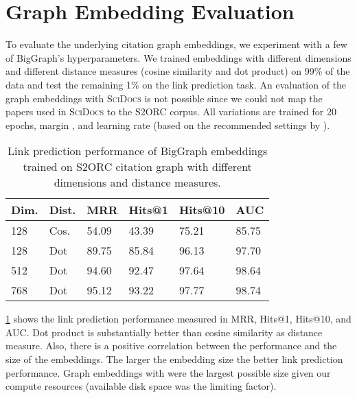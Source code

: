 \documentclass[11pt]{article}
\newcommand{\dataset}{\textsc{SciDocs}\xspace}
\begin{document}
\section{Graph Embedding Evaluation} \label{ssec:graph-evaluation}



To evaluate the underlying citation graph embeddings, we experiment with a few of BigGraph's hyperparameters.
We trained embeddings with different dimensions  and different distance measures (cosine similarity and dot product) on 99\% of the data and test the remaining 1\% on the link prediction task.
An evaluation of the graph embeddings with \dataset is not possible since we could not map the papers used in \dataset to the S2ORC corpus.
All variations are trained for 20 epochs, margin , and learning rate  (based on the recommended settings by \citet{Lerer2019}).

\begin{table}[ht]
\centering
\footnotesize

\caption{Link prediction performance of BigGraph embeddings trained on S2ORC citation graph with different dimensions and distance measures.}
\label{tab:biggraph-results}
\begin{tabular}{ll|llll}
\toprule
\textbf{Dim.} & \textbf{Dist.} & \textbf{MRR} & \textbf{Hits@1} & \textbf{Hits@10} & \textbf{AUC} \\
\midrule
128 & Cos. & 54.09 & 43.39 & 75.21 & 85.75 \\
128 & Dot    & 89.75 & 85.84 & 96.13 & 97.70 \\
512 & Dot    & 94.60 & 92.47 & 97.64 & 98.64 \\
768 & Dot    & 95.12 & 93.22 & 97.77 & 98.74 \\ 
\bottomrule
\end{tabular}
\end{table}

\cref{tab:biggraph-results} shows the link prediction performance measured in MRR, Hits@1, Hits@10, and AUC.
Dot product is substantially better than cosine similarity as distance measure.
Also, there is a positive correlation between the performance and the size of the embeddings.
The larger the embedding size the better link prediction performance.
Graph embeddings with  were the largest possible size given our compute resources (available disk space was the limiting factor).
\end{document}
